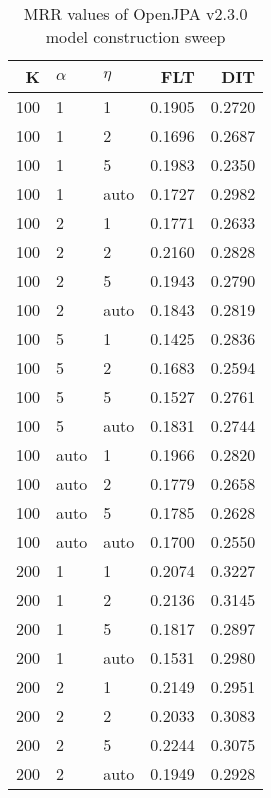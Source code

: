 
\begin{table}
\begin{spacing}{1.2}
\centering
\caption{MRR values of OpenJPA v2.3.0 model construction sweep}
\label{table:openjpa_model_sweep}
\vspace{0.2em}
\parbox{.45\linewidth}{\centering \begin{tabular}{rll|rr}
\toprule
   K & $\alpha$ &   $\eta$ & FLT & DIT \\
\midrule
 100 &     1 &     1 &           0.1905 & 0.2720 \\
 100 &     1 &     2 &           0.1696 & 0.2687 \\
 100 &     1 &     5 &           0.1983 & 0.2350 \\
 100 &     1 &  auto &           0.1727 & 0.2982 \\
 100 &     2 &     1 &           0.1771 & 0.2633 \\
 100 &     2 &     2 &           0.2160 & 0.2828 \\
 100 &     2 &     5 &           0.1943 & 0.2790 \\
 100 &     2 &  auto &           0.1843 & 0.2819 \\
 100 &     5 &     1 &           0.1425 & 0.2836 \\
 100 &     5 &     2 &           0.1683 & 0.2594 \\
 100 &     5 &     5 &           0.1527 & 0.2761 \\
 100 &     5 &  auto &           0.1831 & 0.2744 \\
 100 &  auto &     1 &           0.1966 & 0.2820 \\
 100 &  auto &     2 &           0.1779 & 0.2658 \\
 100 &  auto &     5 &           0.1785 & 0.2628 \\
 100 &  auto &  auto &           0.1700 & 0.2550 \\
 200 &     1 &     1 &           0.2074 & 0.3227 \\
 200 &     1 &     2 &           0.2136 & 0.3145 \\
 200 &     1 &     5 &           0.1817 & 0.2897 \\
 200 &     1 &  auto &           0.1531 & 0.2980 \\
 200 &     2 &     1 &           0.2149 & 0.2951 \\
 200 &     2 &     2 &           0.2033 & 0.3083 \\
 200 &     2 &     5 &           0.2244 & 0.3075 \\
 200 &     2 &  auto &           0.1949 & 0.2928 \\

\end{tabular}}
\end{spacing}
\end{table}
